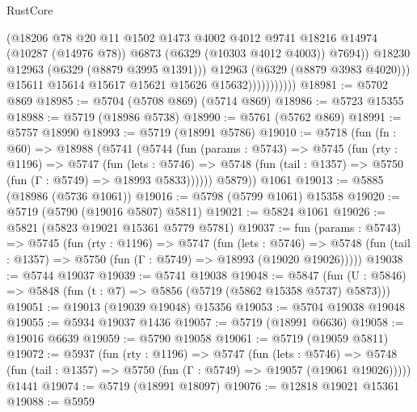 \begin{lexlean}{RustCore}
\begin{coremodule}
                                (@18206
                                  @78
                                  @20
                                  @11
                                  @1502
                                  @1473
                                  @4002
                                  @4012
                                  @9741
                                  @18216
                                  @14974
                                  (@10287 (@14976 @78))
                                  @6873
                                  (@6329 (@10303 @4012 @4003))
                                  @7694))
                              @18230
                              @12963
                              (@6329 (@8879 @3995 @1391)))
                            @12963
                            (@6329 (@8879 @3983 @4020)))
                          @15611
                          @15614
                          @15617
                          @15621
                          @15626
                          @15632)))))))))))
@18981 := @5702 @869
@18985 := @5704 (@5708 @869) (@5714 @869)
@18986 := @5723 @15355
@18988 := @5719 (@18986 @5738)
@18990 := @5761 (@5762 @869)
@18991 := @5757 @18990
@18993 := @5719 (@18991 @5786)
@19010 := @5718
    (fun (fn : @60) =>
    @18988
      (@5741
        (@5744
          (fun (params : @5743) =>
          @5745
            (fun (rty : @1196) =>
            @5747
              (fun (lets : @5746) =>
              @5748 (fun (tail : @1357) => @5750 (fun (Γ : @5749) => @18993 @5833))))))
        @5879))
    @1061
@19013 := @5885 (@18986 (@5736 @1061))
@19016 := @5798 (@5799 @1061) @15358
@19020 := @5719 (@5790 (@19016 @5807) @5811)
@19021 := @5824 @1061
@19026 := @5821 (@5823 @19021 @15361 @5779 @5781)
@19037 := fun (params : @5743) =>
  @5745
    (fun (rty : @1196) =>
    @5747
      (fun (lets : @5746) =>
      @5748 (fun (tail : @1357) => @5750 (fun (Γ : @5749) => @18993 (@19020 @19026)))))
@19038 := @5744 @19037
@19039 := @5741 @19038
@19048 := @5847
    (fun (U : @5846) => @5848 (fun (t : @7) => @5856 (@5719 (@5862 @15358 @5737) @5873)))
@19051 := @19013 (@19039 @19048) @15356
@19053 := @5704 @19038 @19048
@19055 := @5934 @19037 @1436
@19057 := @5719 (@18991 @6636)
@19058 := @19016 @6639
@19059 := @5790 @19058
@19061 := @5719 (@19059 @5811)
@19072 := @5937
    (fun (rty : @1196) =>
    @5747
      (fun (lets : @5746) =>
      @5748 (fun (tail : @1357) => @5750 (fun (Γ : @5749) => @19057 (@19061 @19026)))))
    @1441
@19074 := @5719 (@18991 @18097)
@19076 := @12818 @19021 @15361
@19088 := @5959

\end{coremodule}
\end{lexlean}
